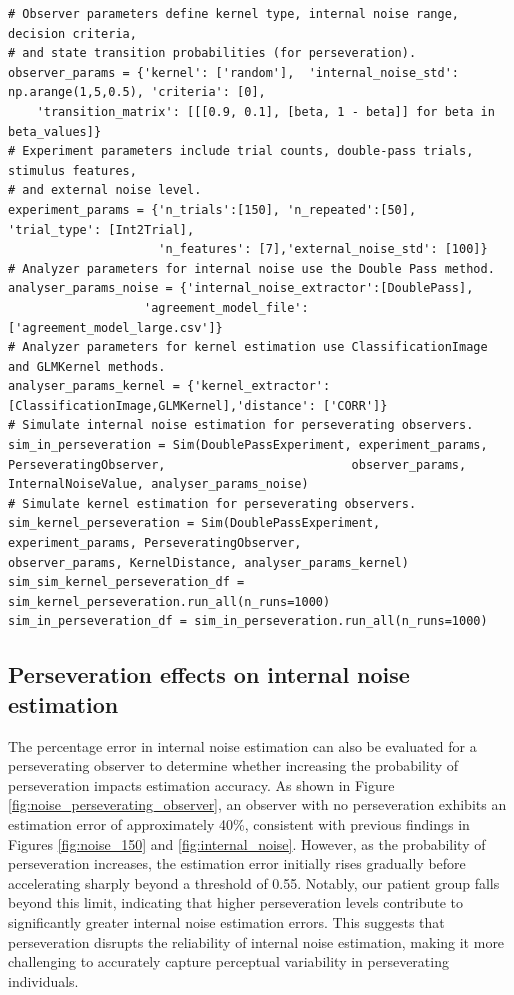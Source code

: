 \begin{tcolorbox}[title=Palin Toolbox: Perseverating observer,
    colback=white!30!white, colframe=blue!80!white]

\begin{verbatim}
# Observer parameters define kernel type, internal noise range, decision criteria, 
# and state transition probabilities (for perseveration).
observer_params = {'kernel': ['random'],  'internal_noise_std': np.arange(1,5,0.5), 'criteria': [0], 
    'transition_matrix': [[[0.9, 0.1], [beta, 1 - beta]] for beta in beta_values]}
# Experiment parameters include trial counts, double-pass trials, stimulus features, 
# and external noise level.
experiment_params = {'n_trials':[150], 'n_repeated':[50], 'trial_type': [Int2Trial],
                     'n_features': [7],'external_noise_std': [100]}
# Analyzer parameters for internal noise use the Double Pass method.
analyser_params_noise = {'internal_noise_extractor':[DoublePass],
                   'agreement_model_file':['agreement_model_large.csv']}   
# Analyzer parameters for kernel estimation use ClassificationImage and GLMKernel methods.
analyser_params_kernel = {'kernel_extractor': [ClassificationImage,GLMKernel],'distance': ['CORR']}
# Simulate internal noise estimation for perseverating observers.                  
sim_in_perseveration = Sim(DoublePassExperiment, experiment_params, PerseveratingObserver,                          observer_params, InternalNoiseValue, analyser_params_noise)
# Simulate kernel estimation for perseverating observers.
sim_kernel_perseveration = Sim(DoublePassExperiment, experiment_params, PerseveratingObserver,                      observer_params, KernelDistance, analyser_params_kernel)
sim_sim_kernel_perseveration_df = sim_kernel_perseveration.run_all(n_runs=1000) 
sim_in_perseveration_df = sim_in_perseveration.run_all(n_runs=1000)
\end{verbatim}

\end{tcolorbox}
\subsection{Perseveration effects on internal noise estimation}
The percentage error in internal noise estimation can also be evaluated for a perseverating observer to determine whether increasing the probability of perseveration impacts estimation accuracy. As shown in Figure \ref{fig:noise_perseverating_observer}, an observer with no perseveration exhibits an estimation error of approximately 40\%, consistent with previous findings in Figures \ref{fig:noise_150} and \ref{fig:internal_noise}. However, as the probability of perseveration increases, the estimation error initially rises gradually before accelerating sharply beyond a threshold of 0.55. Notably, our patient group falls beyond this limit, indicating that higher perseveration levels contribute to significantly greater internal noise estimation errors. This suggests that perseveration disrupts the reliability of internal noise estimation, making it more challenging to accurately capture perceptual variability in perseverating individuals.

